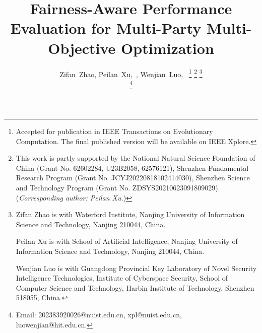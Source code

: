 \documentclass[journal]{IEEEtran}
\begin{document}
\title{Fairness-Aware Performance Evaluation for Multi-Party Multi-Objective Optimization}

\author{Zifan~Zhao, Peilan~Xu,~, Wenjian~Luo,~
    \thanks{Accepted for publication in IEEE Transactions on Evolutionary Computation. The final published version will be available on IEEE Xplore.}
	\thanks{This work is partly supported by the National Natural Science Foundation of China (Grant No. 62602284, U23B2058, 62576121), Shenzhen Fundamental Research Program (Grant No. JCYJ20220818102414030), Shenzhen Science and Technology Program (Grant No. ZDSYS20210623091809029). (\textit{Corresponding author: Peilan Xu.}) }
	\thanks{Zifan Zhao is with Waterford Institute, Nanjing University of Information Science and Technology, Nanjing 210044, China.
		
		Peilan Xu is with School of Artificial Intelligence, Nanjing University of Information Science and Technology, Nanjing 210044, China.

    Wenjian Luo is with Guangdong Provincial Key Laboratory of Novel Security Intelligence Technologies, Institute of Cyberspace Security, School of Computer Science and Technology, Harbin Institute of Technology, Shenzhen 518055, China.}
	
	\thanks{Email: 202383920026@nuist.edu.cn, xpl@nuist.edu.cn, luowenjian@hit.edu.cn.}
}

\maketitle
\end{document}
